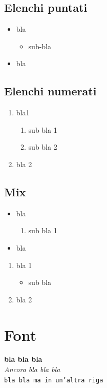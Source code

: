 \documentclass[12pt,a4paper,twoside]{book}
\begin{document}
\subsection{Elenchi puntati}
\begin{itemize}
    \item bla
    \begin{itemize}
        \item sub-bla
    \end{itemize}
    \item bla
\end{itemize}

\subsection{Elenchi numerati}
\begin{enumerate}
    \item bla1
    \begin{enumerate}
        \item sub bla 1
        \item sub bla 2
    \end{enumerate}
    \item bla 2
\end{enumerate}

\subsection{Mix}
\begin{itemize}
    \item bla
    \begin{enumerate}
        \item sub bla 1
    \end{enumerate}
    \item bla
\end{itemize}

\begin{enumerate}
    \item bla 1
    \begin{itemize}
        \item sub bla
    \end{itemize}
    \item bla 2
\end{enumerate}

\section{Font}
\textbf{bla bla bla}\\
\textit{Ancora bla bla bla}\\
\texttt{bla bla ma in un'altra riga}
\end{document}

